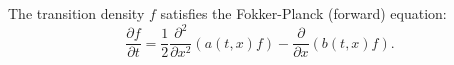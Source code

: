 The transition density $f$ satisfies the Fokker-Planck (forward) equation:
$$\frac{\partial f}{\partial t} = \frac{1}{2} \frac{\partial^2}{\partial x^2} (a(t,x)f) - \frac{\partial}{\partial x} (b(t,x)f).$$
